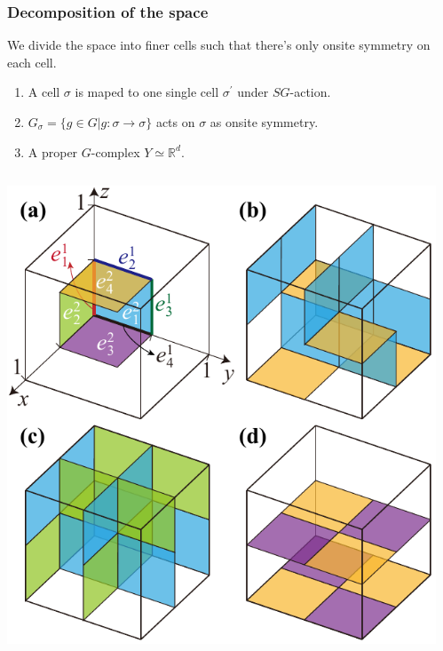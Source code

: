 \documentclass[xcolor=table, 11pt, aspectratio=169]{beamer}
\begin{document}
\begin{frame}
	\frametitle{Decomposition of the space}
	We divide the space into \alert{finer cells} such that there's \alert{only onsite symmetry} on each cell.
	\begin{enumerate}
		\item A cell $\sigma$ is maped to one single cell $\sigma^\prime$ under $SG$-action.
		\item $G_\sigma=\{g\in G|g:\sigma\rightarrow\sigma\}$ acts on $\sigma$ as onsite symmetry.
		\item A proper $G$-complex $Y\simeq \mathbb R^d$.
	\end{enumerate}
	\begin{columns}
		\begin{center}
			\includegraphics[width=.5\textwidth]{../spspt/blocks}
		\end{center}
		\begin{center}
		\end{center}
	\end{columns}
\end{frame}
\end{document}
